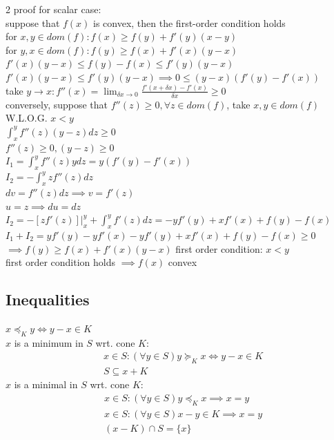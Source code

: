 \documentclass[8pt]{extarticle}
\newcommand{\set}[1]{\{#1\}}
\begin{document}
\begin{multicols*}{2}
  proof for scalar case:\\
  suppose that $f(x)$ is convex, then the first-order condition holds\\
  for $x,y \in dom(f): f(x) \geq f(y) + f'(y)(x-y)$\\
  for $y,x \in dom(f): f(y) \geq f(x) + f'(x)(y-x)$\\
  $f'(x)(y-x) \leq f(y)-f(x) \leq f'(y)(y-x)$\\
  $f'(x)(y-x) \leq f'(y)(y-x) \implies 0 \leq (y-x)(f'(y)-f'(x))$\\
  take $y\to x: f''(x) = \lim_{\delta x \to 0}\frac{f'(x+\delta x)-f'(x)}{\delta x} \geq 0$\\

  conversely, suppose that $f''(z) \geq 0, \forall z \in dom(f)$, take $x,y \in dom(f)$ W.L.O.G. $x < y$\\
  $\int_x^y f''(z)(y-z) dz \geq 0$\\
  $f''(z) \geq 0, (y-z) \geq 0$\\
  $I_1 = \int_x^y f''(z)y dz =  y(f'(y)-f'(x))$\\
  $I_2 = -\int_x^y zf''(z) dz$\\
  $dv=f''(z) dz \implies v = f'(z)$\\
  $u=z\implies du = dz$\\
  $I_2 = -[z f'(z)]|_x^y + \int_x^y f'(z) dz = -y f'(y) + x f'(x)+f(y)-f(x)$\\
  $I_1+I_2=y f'(y)-y f'(x)-y f'(y) + x f'(x) + f(y)-f(x) \geq 0$\\
  $\implies f(y) \geq f(x) + f'(x)(y-x)$ first order condition: $x<y$\\
  first order condition holds $\implies f(x)$ convex\\

  \vfill\null
  \columnbreak

  \subsection{Inequalities}
  $x \preceq_K y \iff y-x \in K$\\
  
  $x$ is a minimum in $S$ wrt. cone $K$:
  \begin{align*}
    &x \in S: (\forall y \in S) y \succeq_K x \iff y-x \in K\\
    &S \subseteq x+K
  \end{align*}
  $x$ is a minimal in $S$ wrt. cone $K$:
  \begin{align*}
    &x \in S: (\forall y \in S) y \preceq_K x \implies x = y\\
    &x \in S: (\forall y \in S) x-y \in K \implies x = y\\
    &(x-K) \cap S = \set{x}
  \end{align*}

\end{multicols*}
\end{document}
